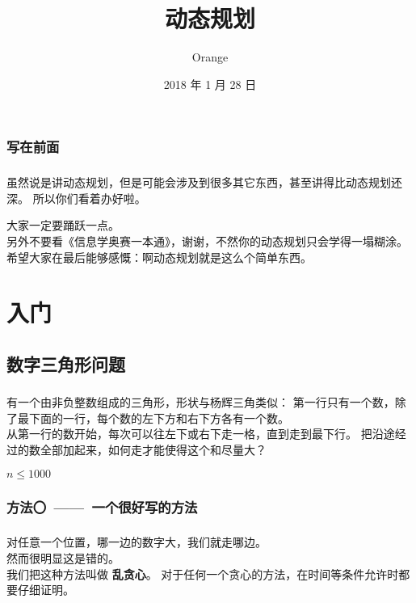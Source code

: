 \documentclass[UTF8]{beamer}
\title{动态规划}
\author{Orange}
\institute{CQ No.11 High}
\date{2018 年 1 月 28 日}
\begin{document}
	\heiti %
	\setlength{\parindent}{2em} %

	\begin{frame} %
		\titlepage
	\end{frame}
	
	\subsubsection{写在前面}
	\begin{frame}
		\frametitle{\insertsubsubsection} %
		虽然说是讲动态规划，但是可能会涉及到很多其它东西，甚至讲得比动态规划还深。
		所以你们看着办好啦。
		
		大家一定要踊跃一点。
		\\\pause %
		\vspace{5mm} %
		另外不要看《信息学奥赛一本通》，谢谢，不然你的动态规划只会学得一塌糊涂。
		\\\pause
		\vspace{5mm}
		希望大家在最后能够感慨：啊动态规划就是这么个简单东西。
	\end{frame}


	\section{入门}
	\subsection{数字三角形问题}

	\begin{frame}
		\frametitle{\insertsubsection} %
		有一个由非负整数组成的三角形，形状与杨辉三角类似：
		第一行只有一个数，除了最下面的一行，每个数的左下方和右下方各有一个数。
		\\
		从第一行的数开始，每次可以往左下或右下走一格，直到走到最下行。
		把沿途经过的数全部加起来，如何走才能使得这个和尽量大？
		\\
		\begin{center} %
			{\LARGE $n \le 1000$} %
		\end{center}
	\end{frame}

	\subsubsection{方法〇~——~一个很好写的方法} %
	\begin{frame}
		\frametitle{\insertsubsubsection}
		对任意一个位置，哪一边的数字大，我们就走哪边。
		\\\pause
		然而很明显这是错的。
		\\\pause
		我们把这种方法叫做 \textbf{乱贪心}。 %
		对于任何一个贪心的方法，在时间等条件允许时都要仔细证明。
	\end{frame}
\end{document}
